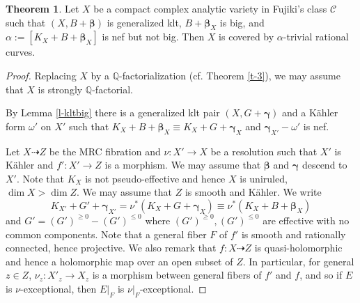 \documentclass[11pt]{amsart}
\numberwithin{equation}{section}
\def\bbeta{\boldsymbol{\beta}}
\def\ggamma{\boldsymbol{\gamma}}
\def\dim{\operatorname{dim}}
\newcommand\Q{{\mathbb{Q}}}
\newcommand\R{{\mathbb{R}}}
\theoremstyle{definition}
\theoremstyle{definition}
\newtheorem{theorem}{Theorem}[section]
\theoremstyle{definition}
\begin{document}
\begin{theorem} 
\label{t-raynonbig}%
Let $X$ be a compact complex analytic variety in Fujiki's class $\mathcal C$ such that $(X,B+\bbeta)$ is generalized klt, $B+\bbeta _X$ is big, and $\alpha:=[K_X+B+\bbeta _X]$ is nef but not big. Then $X$ is covered by $\alpha $-trivial  rational curves.
\end{theorem}
\begin{proof} Replacing $X$ by a $\Q$-factorialization (cf. Theorem \ref{t-3}), we may assume that $X$ is strongly $\Q$-factorial.

By Lemma \ref{l-kltbig} there is a generalized klt pair $(X,G+\ggamma)$ and a K\"ahler form $\omega'$ on $X'$ such that $K_{X}+B+\bbeta _{X}\equiv K_{X}+G+\ggamma _{X}$ and $\ggamma _{X'}-\omega'$ is nef. 





Let $X\dasharrow Z$ be the MRC fibration and $\nu :X'\to X$ be a resolution such that $X'$ is K\"ahler and $f':X'\to Z$ is a morphism. We may assume that $\bbeta$ and $\ggamma$ descend to $X'$. %
Note that $K_X$ is not pseudo-effective and hence $X$ is uniruled, $\dim X>\dim Z$. We may assume that $Z$ is smooth and K\"ahler. We write \[K_{X'}+G'+\ggamma _{X'}=\nu ^*(K_X+G+\ggamma _X)\equiv \nu ^*(K_X+B+\bbeta _X)\] and $G'=(G')^{\geq 0}-(G')^{\leq 0}$ where $(G')^{\geq 0},(G')^{\leq 0}$ are effective with no common components.  Note that a general fiber $F$ of $f'$ is smooth and rationally connected, hence projective.  We also remark that $f:X\dasharrow Z$ is quasi-holomorphic and hence a holomorphic map over an open subset of $Z$. In particular, for general $z\in Z$, $\nu _z:X'_z\to X_z$ is a morphism between general fibers of $f'$ and $f$, and so if $E$ is $\nu$-exceptional, then $E|_F$  is $\nu |_F$-exceptional. 


\end{proof}
\end{document}
